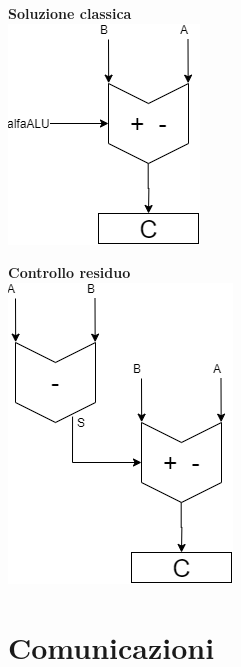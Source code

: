 \documentclass[10pt]{report}
\begin{document}
\begin{list}{}{}
	\begin{multicols}{2}
	\begin{center}
	\textbf{Soluzione classica}\\
	\includegraphics[scale=0.5]{contrres_es3.png}
	\end{center}
	\columnbreak
	\begin{center}
	\textbf{Controllo residuo}\\
	\includegraphics[scale=0.5]{contrres_es3b.png}
	\end{center}
	\end{multicols}
\end{list}
\section{Comunicazioni}
\end{document}
